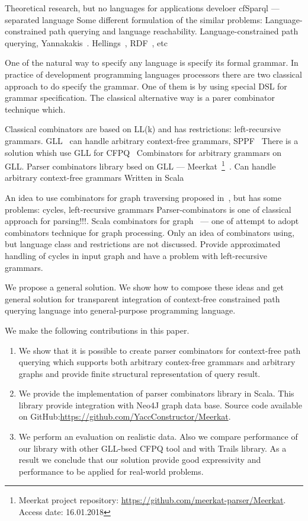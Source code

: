 Theoretical research, but no languages for applications develoer
cfSparql --- separated language
Some different formulation of the similar problems: Language-constrained path querying and language reachability.
Language-constrained path querying, Yannakakis~\cite{Yannakakis}. 
Hellings~\cite{ConjCFPathQuery, Hellings16}, RDF~\cite{CFGonRDF}, etc~\cite{QueryGraphWithData, RegularDBQuery, GraphQueryWithEarley, FLCpathProblem, graphDB}

One of the natural way to specify any language is specify its formal grammar.
In practice of development programming languages processors there are two classical approach to do specify the grammar.
One of them is by using special DSL for grammar specification.
The classical alternative way is a parer combinator technique which.

Classical combinators are based on LL(k) and has restrictions: left-recursive grammars.
GLL~\cite{scott2010gll} can handle arbitrary context-free grammars, SPPF~\cite{SPPF}
There is a solution whish use GLL for CFPQ~\cite{GrigorevR16}
Combinators for arbitrary grammars on GLL. 
Parser combinators library bsed on GLL --- Meerkat~\footnote{Meerkat project repository: \url{https://github.com/meerkat-parser/Meerkat}. Access date: 16.01.2018}~\cite{Meerkat}. 
Can handle arbitrary context-free grammars
Written in Scala


An idea to use combinators for graph traversing proposed in~\cite{ScalaGraphParsing}, but has some problems: cycles, left-recursive grammars
Parser-combinators is one of classical approach for parsing!!!.
Scala combinators for graph~\cite{ScalaGraphParsing} --- one of attempt to adopt combinators technique for graph processing.
Only an idea of combinators using, but language class and restrictions are not discussed.
Provide approximated handling of cycles in input graph and have a problem with left-recursive grammars. 

We propose a general solution.
We show how to compose these ideas and get general solution for transparent integration of context-free constrained path querying language into general-purpose programming language.

We make the following contributions in this paper.

\begin{enumerate}
\item We show that it is possible to create parser combinators for context-free path querying which supports both arbitrary contex-free grammars and arbitrary graphs and provide finite structural representation of query result.
\item We provide the implementation of parser combinators library in Scala. This library provide integration with Neo4J graph data base. Source code available on GitHub:\url{https://github.com/YaccConstructor/Meerkat}.
\item We perform an evaluation on realistic data. 
Also we compare performance of our library with other GLL-bsed CFPQ tool and with Trails library.
As a result we conclude that our solution provide good expressivity and performance to be applied for real-world problems. 
\end{enumerate}